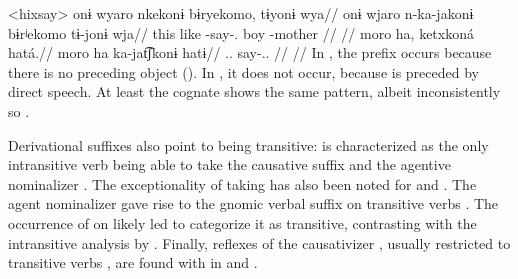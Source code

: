 \pex<hixsay>\hixka
{}
\begingl
\glpreamble onɨ wyaro nkekonɨ bɨryekomo, tɨyonɨ wya//
\gla onɨ wjaro n-ka-jakonɨ bɨrʲekomo tɨ-jonɨ wja//
\glb this like -say-. boy -mother //
\glft {} \parencite[][36]{hixkaryanaderby1985}//
\endgl
{}
\begingl
\glpreamble moro ha, ketxkoná hatá.//
\gla moro ha ka-jat͡ʃkonɨ hatɨ//
\glb {}..  say-.. //
\glft {} \parencite[][14]{derbyshire1965textos}//
\endgl
\xe
In , the prefix  occurs because there is no preceding object ().
In , it does not occur, because  is preceded by direct speech.
At least the \trio cognate shows the same pattern, albeit inconsistently so \parencite[267]{triocarlin2004}.

Derivational suffixes also point to   being transitive:
\trio {} is characterized as the only intransitive verb being able to take the causative suffix  and the agentive nominalizer  \parencite[263, 169]{triomeira1999}.
The exceptionality of   taking   has also been noted for \kalina \parencite[82]{courtz2008carib} and \wayana \parencite[258]{wayanatavares2005}.
The agent nominalizer  gave rise to the \panare gnomic verbal suffix  on transitive verbs \parencite[184--185]{gildea1998}.
The occurrence of  on  likely led \textcite[214]{panarepayne2013} to categorize it as transitive, contrasting with the intransitive analysis by \textcite[102]{mattei1994diccionario}.
Finally, reflexes of the causativizer , usually restricted to transitive verbs \parencite{gildea2015valency}, are found with  in \apalai \parencite[51]{koehn1986apalai} and \waiwai \parencite[52]{waiwaihawkins1998}.

